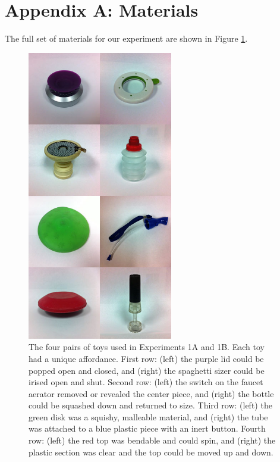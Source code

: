 \documentclass[man]{apa2}
\begin{document}



\newpage
\theappendix 

\section{Appendix A: Materials}

The full set of materials for our experiment are shown in Figure \ref{fig:toys}. 
\begin{figure}
  \begin{center} 
    \includegraphics[width=2.5in]{figures/discourse_toys_images.jpg} 
    \caption{\label{fig:toys} The four pairs of toys used in Experiments 1A and 1B. Each toy had a unique affordance. First row: (left) the purple lid could be popped open and closed, and (right) the spaghetti sizer could be irised open and shut.  Second row: (left) the switch on the faucet aerator removed or revealed the center piece, and (right) the bottle could be squashed down and returned to size.  Third row: (left) the green disk was a squishy, malleable material, and (right) the tube was attached to a blue plastic piece with an inert button.  Fourth row: (left) the red top was bendable and could spin, and (right) the plastic section was clear and the top could be moved up and down. } 
  \end{center} 
\end{figure}
\end{document}
